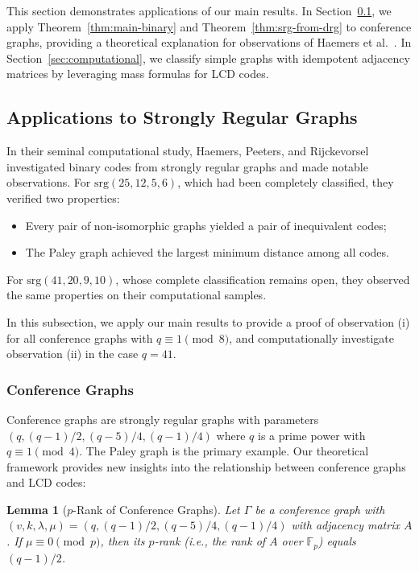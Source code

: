 \documentclass[a4paper,11pt]{article}
\newtheorem{lemma}[theorem]{Lemma}
\theoremstyle{remark}
\begin{document}
This section demonstrates applications of our main results. In Section~\ref{sec:srg-applications}, we apply Theorem~\ref{thm:main-binary} and Theorem~\ref{thm:srg-from-drg} to conference graphs, providing a theoretical explanation for observations of Haemers et al.\ \cite{haemers1999}. In Section~\ref{sec:computational}, we classify simple graphs with idempotent adjacency matrices by leveraging mass formulas for LCD codes.

\subsection{Applications to Strongly Regular Graphs}\label{sec:srg-applications}

In their seminal computational study, Haemers, Peeters, and Rijckevorsel \cite{haemers1999} investigated binary codes from strongly regular graphs and made notable observations. For $\text{srg}(25,12,5,6)$, which had been completely classified, they verified two properties:
\begin{itemize}
\item[(i)] Every pair of non-isomorphic graphs yielded a pair of inequivalent codes;
\item[(ii)] The Paley graph achieved the largest minimum distance among all codes.
\end{itemize}
For $\text{srg}(41,20,9,10)$, whose complete classification remains open, they observed the same properties on their computational samples.

In this subsection, we apply our main results to provide a proof of observation (i) for all conference graphs with $q \equiv 1 \pmod 8$, and computationally investigate observation (ii) in the case $q = 41$.

\subsubsection{Conference Graphs}

Conference graphs are strongly regular graphs with parameters $(q,(q-1)/2,(q-5)/4,(q-1)/4)$ where $q$ is a prime power with $q \equiv 1 \pmod 4$. The Paley graph is the primary example.
Our theoretical framework provides new insights into the relationship between conference graphs and LCD codes:

\begin{lemma}[$p$-Rank of Conference Graphs{\cite[Section 4 (iii)]{brouwer1992}}]\label{lem:p-rank}
Let $\Gamma$ be a conference graph with $(v,k,\lambda,\mu)=(q,(q-1)/2,(q-5)/4,(q-1)/4)$ with adjacency matrix $A$.
If $\mu \equiv 0 \pmod p$, then its $p$-rank (i.e., the rank of $A$ over $\mathbb{F}_p$) equals $(q-1)/2$.
\end{lemma}
\end{document}
